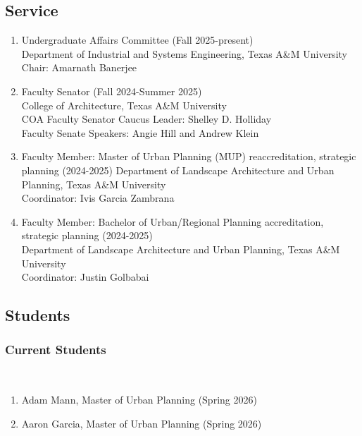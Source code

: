 \documentclass[11pt,oneside]{article}
\begin{document}
\subsection{Service}
\begin{enumerate}[leftmargin=40pt]
\item {Undergraduate Affairs Committee (Fall 2025-present)}\\
      {Department of Industrial and Systems Engineering, Texas A\&M University}\\
      Chair: Amarnath Banerjee
\item Faculty Senator (Fall 2024-Summer 2025)\\
      {College of Architecture, Texas A\&M University}\\
      COA Faculty Senator Caucus Leader: Shelley D. Holliday\\
      Faculty Senate Speakers: Angie Hill and Andrew Klein
\item Faculty Member: Master of Urban Planning (MUP) reaccreditation, strategic planning (2024-2025)
      {Department of Landscape Architecture and Urban Planning, Texas A\&M University}\\
      Coordinator: Ivis Garcia Zambrana
\item Faculty Member: Bachelor of Urban/Regional Planning accreditation, strategic planning (2024-2025)\\
      {Department of Landscape Architecture and Urban Planning, Texas A\&M University}\\
      Coordinator: Justin Golbabai
\end{enumerate}

\subsection{Students}
\subsubsection{Current Students}
\hspace{40pt}{\frutigerregular External Committee Member}\\
\begin{enumerate}[leftmargin=40pt]
\item Adam Mann, Master of Urban Planning (Spring 2026)
\item Aaron Garcia, Master of Urban Planning (Spring 2026)
\end{enumerate}
\end{document}
